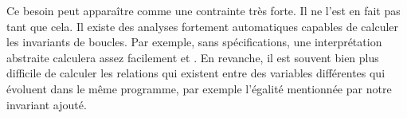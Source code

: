 \begin{Information}
Ce besoin peut apparaître comme une contrainte très forte. Il ne l'est en fait pas
tant que cela. Il existe des analyses fortement automatiques capables de 
calculer les invariants de boucles. Par exemple, sans spécifications, une 
interprétation abstraite calculera assez facilement  et 
. En revanche, il est souvent bien plus difficile
de calculer les relations qui existent entre des variables différentes qui 
évoluent dans le même programme, par exemple l'égalité mentionnée par notre 
invariant ajouté.
\end{Information}

